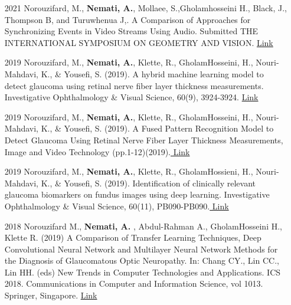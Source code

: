 \documentclass[letterpaper,11pt]{article}
\begin{document}
\begin{enumerate}
    \item[2021]  Norouzifard, M., \textbf{Nemati, A.}, Mollaee, S.,Gholamhosseini H., Black, J., Thompson B, and Turuwhenua J,.  A Comparison of Approaches for Synchronizing Events in Video Streams Using Audio. Submitted THE INTERNATIONAL SYMPOSIUM ON GEOMETRY AND VISION. \hspace*{0pt}\hfill {\color{blue}\href{http://dx.doi.org/10.1007/978-3-030-72073-5_20}{ Link}}
    
    \item[2019] Norouzifard, M., \textbf{Nemati, A.}, Klette, R., GholamHosseini, H., Nouri-Mahdavi, K., \& Yousefi, S. (2019). A hybrid machine learning model to detect glaucoma using retinal nerve fiber layer thickness measurements. Investigative Ophthalmology \& Visual Science, 60(9), 3924-3924. \hspace*{0pt}\hfill {\color{blue}\href{https://iovs.arvojournals.org/article.aspx?articleid=2746956}{ Link}}
    
   \item[2019] Norouzifard, M., \textbf{Nemati, A.}, Klette, R., GholamHosseini, H., Nouri-Mahdavi, K., \& Yousefi, S. (2019). A Fused Pattern Recognition Model to Detect Glaucoma Using Retinal Nerve Fiber Layer Thickness Measurements, Image and Video Technology (pp.1-12)(2019).\hspace*{0pt}\hfill {\color{blue}\href{https://www.springerprofessional.de/en/a-fused-pattern-recognition-model-to-detect-glaucoma-using-retin/17379584}{ Link}}
    
    \item[2019] Norouzifard, M., \textbf{Nemati, A.}, Klette, R., GholamHossieni, H., Nouri-Mahdavi, K., \& Yousefi, S. (2019). Identification of clinically relevant glaucoma biomarkers on fundus images using deep learning. Investigative Ophthalmology \& Visual Science, 60(11), PB090-PB090.\hspace*{0pt}\hfill {\color{blue}\href{https://iovs.arvojournals.org/article.aspx?articleid=2748168}{ Link}}
    
    
    
    \item[2018] Norouzifard M., \textbf{Nemati, A.} , Abdul-Rahman A., GholamHosseini H., Klette R. (2019) A Comparison of Transfer Learning Techniques, Deep Convolutional Neural Network and Multilayer Neural Network Methods for the Diagnosis of Glaucomatous Optic Neuropathy. In: Chang CY., Lin CC., Lin HH. (eds) New Trends in Computer Technologies and Applications. ICS 2018. Communications in Computer and Information Science, vol 1013. Springer, Singapore.\hspace*{0pt}\hfill
    {\color{blue}\href{http://dx.doi.org/10.1007/978-981-13-9190-3_69}{ Link}}
    

\end{enumerate}
\end{document}
